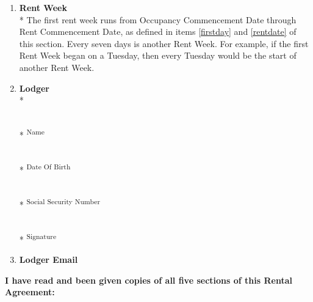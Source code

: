 \documentclass[12pt,letterpaper]{article}
\newcommand{\lodger}{Lodger}
\newcommand{\firstday}{Occupancy Commencement Date}
\newcommand{\rentdate}{Rent Commencement Date}
\newcommand{\rentweek}{Rent Week}
\newcommand{\lemail}{Lodger Email}
\begin{document}
\begin{multicols}{2}
\begin{enumerate}
		\item \textbf{\rentweek{}}\\* \label{rentweek}
			The first rent week runs from \firstday{} through \rentdate{}, as defined in items \ref{firstday} and \ref{rentdate} of this section.  Every seven days is another \rentweek{}. For example, if the first \rentweek{} began on a Tuesday, then every Tuesday would be the start of another \rentweek{}.
			
		\item \textbf{\lodger{}}\\* \label{lodger}
			\begin{minipage}[t]{2in}

				\vspace{0.2cm}\makebox[2in]{\hrulefill} \\*
				\textsuperscript{Name}
				
				\vspace{0.2cm}\makebox[2in]{\hrulefill} \\*
				\textsuperscript{Date Of Birth}
				
				\vspace{0.5cm}\makebox[2in]{\hrulefill} \\*
				\textsuperscript{Social Security Number}
				
				\vspace{0.5cm}\makebox[2in]{\hrulefill} \\*
				\textsuperscript{Signature}
			\end{minipage}%

		\item \textbf{\lemail{}} \label{lemail}

			\vspace{0.5cm}\makebox[2in]{\hrulefill}

			\vspace{0.5cm}\makebox[2in]{\hrulefill}
	\end{enumerate}
\end{multicols}

\noindent \textbf{I have read and been given copies of all five sections of this Rental Agreement:}
\end{document}
